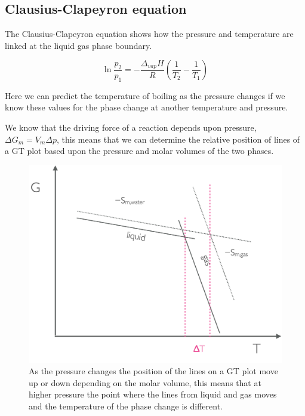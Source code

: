 \documentclass[
]{book}
\begin{document}
\hypertarget{clausius-clapeyron-equation}{%
\subsection{Clausius-Clapeyron equation}\label{clausius-clapeyron-equation}}

The Clausius-Clapeyron equation shows how the pressure and temperature are linked at the liquid gas phase boundary.

\begin{equation}
\ln \frac{p_2}{p_1}=-\frac{\Delta _{vap}H}{R}\left( \frac{1}{T_2}-\frac{1}{T_1}\right)
\label{eq:clausiusclapeyron}
\end{equation}

Here we can predict the temperature of boiling as the pressure changes if we know these values for the phase change at another temperature and pressure.

We know that the driving force of a reaction depends upon pressure, \(\Delta G _m = V_m \Delta p\), this means that we can determine the relative position of lines of a GT plot based upon the pressure and molar volumes of the two phases.

\begin{figure}

{\centering \includegraphics[width=0.8\linewidth]{images/boilingpressure} 

}

\caption{As the pressure changes the position of the lines on a GT plot move up or down depending on the molar volume, this means that at higher pressure the point where the lines from liquid and gas moves and the temperature of the phase change is different.}\label{fig:boilingpressure}
\end{figure}
\end{document}
